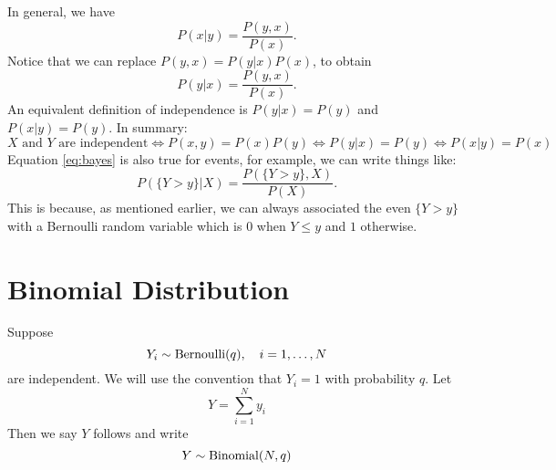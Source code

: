 %


 In general, we have 
\begin{equation}
P(x|y) = \frac{P(y,x)}{P(x)}.
\end{equation}
Notice that we can replace $P(y,x) = P(y|x)P(x)$, to obtain 
\begin{equation}\label{eq:bayes}
P(y|x) = \frac{P(y,x)}{P(x)}.
\end{equation}
An equivalent definition of independence is $P(y|x)  = P(y)$ and $P(x|y) = P(y)$.  In summary: 
\begin{equation*}
\text{$X$ and $Y$ are independent} \iff P(x,y) = P(x)P(y) \iff P(y|x) = P(y) \iff P(x|y) = P(x)
\end{equation*}
Equation \eqref{eq:bayes} is also true for events, for example, we can write things like: 
\begin{equation}\label{eq:bayes}
P(\{Y>y\}|X) = \frac{P(\{Y>y\},X)}{P(X)}.
\end{equation}
This is because, as mentioned earlier, we can always associated the even $\{Y>y\}$ with a Bernoulli random variable which is $0$ when $Y \le y$ and $1$ otherwise. 



  \section{Binomial Distribution}
 Suppose 
  \begin{equation*}
  Y_i \sim {\rm Bernoulli}(q),\quad i =1,\dots, N
  \end{equation*} 
  are independent. We will use the convention that $Y_i=1$ with probability $q$. Let
\begin{equation*}
Y = \sum_{i=1}^N y_i
\end{equation*}
 Then we say $Y$ follows  and write
\begin{equation*}
Y \sim {\rm Binomial}(N,q)
\end{equation*}

 
 
